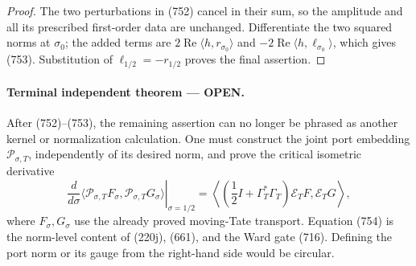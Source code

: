 \documentclass[11pt]{article}
\newcommand{\OPEN}{\textcolor{red!70!black}{\textbf{OPEN}}}
\begin{document}
\begin{proof}
The two perturbations in (752) cancel in their sum, so the amplitude and
all its prescribed first-order data are unchanged.  Differentiate the two
squared norms at \(\sigma_0\); the added terms are
\(2\operatorname{Re}\langle h,r_{\sigma_0}\rangle\) and
\(-2\operatorname{Re}\langle h,\ell_{\sigma_0}\rangle\), which gives
(753).  Substitution of \(\ell_{1/2}=-r_{1/2}\) proves the final assertion.
\end{proof}

\paragraph{Terminal independent theorem --- \OPEN.}
After (752)--(753), the remaining assertion can no longer be phrased as
another kernel or normalization calculation.  One must construct the
joint port embedding \(\mathscr P_{\sigma,T}\), independently of its
desired norm, and prove the critical isometric derivative
\begin{equation}
 \boxed{
 \left.\frac d{d\sigma}
 \langle\mathscr P_{\sigma,T}F_\sigma,
        \mathscr P_{\sigma,T}G_\sigma\rangle
 \right|_{\sigma=1/2}
 =
 \left\langle
 \left(\frac12I+\Gamma_T^*\Gamma_T\right)
 \mathcal E_TF,\mathcal E_TG\right\rangle,}          \tag{754}
\end{equation}
where \(F_\sigma,G_\sigma\) use the already proved moving-Tate transport.
Equation (754) is the norm-level content of (220j), (661), and the Ward
gate (716).  Defining the port norm or its gauge from the right-hand side
would be circular.
\end{document}
